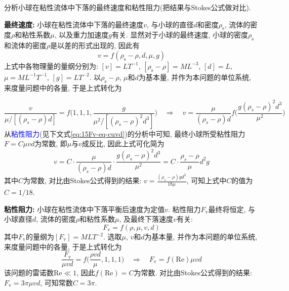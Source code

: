 \begin{problem}[15]
分析小球在粘性流体中下落的最终速度和粘性阻力(把结果与Stokes公式做对比).
\end{problem}
\begin{solution}
\begin{minipage}[c]{0.8\linewidth}
\textbf{最终速度:} 小球在粘性流体中下落的最终速度$v$, 与小球的直径$d$和密度$\rho_\mathrm{s}$, 流体的密度$\rho$和粘性系数$\mu$, 以及重力加速度$g$有关. 显然对于小球的最终速度, 小球的密度$\rho_\mathrm{s}$和流体的密度$\rho$是以差的形式出现的, 因此有
\[
v = f(\rho_\mathrm{s}-\rho, d, \mu, g)
\]
上式中各物理量的量纲分别为: $[v]=LT^{-1}$, $[\rho_\mathrm{s}-\rho]=ML^{-3}$, $[d]=L$, $\mu=ML^{-1}T^{-1}$, $[g]=LT^{-2}$. 以$\rho_\mathrm{s}-\rho$, $\mu$和$d$为基本量, 并作为本问题的单位系统, 来度量问题中的各量, 于是上式转化为
\end{minipage}
\begin{minipage}[c]{0.2\linewidth}
\begin{center}

\end{center}
\end{minipage}\vspace{5pt}
\[
\frac{v}{\mu/[(\rho_s-\rho)d]} = f\bigg(1,1,1,\frac{g}{\mu^2/[(\rho_s-\rho)^2 d^3]}\bigg) 
\quad\Longrightarrow\quad
v = \frac{\mu}{(\rho_s-\rho)d}f\bigg(\frac{g(\rho_s-\rho)^2d^3}{\mu^2}\bigg)
\]
从\textcolor{blue}{粘性阻力}(见下文式\ref{eq:15Fv-eq-cuvd})的分析中可知, 最终小球所受粘性阻力$F=C\mu v d$为常数, 即$\mu$与$v$成反比, 因此上式可化简为
\[
v = C\cdot\frac{\mu}{(\rho_s-\rho)d} \cdot \frac{g(\rho_s-\rho)^2d^3}{\mu^2} 
= C\cdot\frac{\rho_s-\rho}{\mu} d^2 g
\]
其中$C$为常数, 对比由Stokes公式得到的结果: $v = \frac{(\rho_s-\rho)gd^2}{18\mu}$, 可知上式中$C$的值为$C = 1/18$.

\vspace{10pt}

\noindent\textbf{粘性阻力:} 小球在粘性流体中下落平衡后速度为定值$v$. 粘性阻力$F_\mathrm{v}$最终将恒定, 与小球直径$d$, 流体的密度$\rho$和粘性系数$\mu$, 及最终下落速度$v$有关:
\[
F_\mathrm{v} = f(\rho, \mu, v, d)
\]
其中$F_\mathrm{v}$的量纲为$[F_\mathrm{v}]=MLT^{-2}$. 选取$\mu$, $v$和$d$为基本量, 并作为本问题的单位系统, 来度量问题中的各量, 于是上式转化为
\begin{equation}\label{eq:15Fv-eq-cuvd}
\frac{F_\mathrm{v}}{\mu vd} = f\bigg(\frac{\rho v d}{\mu},1,1,1\bigg)
\quad\Longrightarrow\quad
F_\mathrm{v} = f(\mathrm{Re}) \mu vd
\end{equation}
该问题的雷诺数$\mathrm{Re}\ll 1$, 因此$f(\mathrm{Re})=C$为常数. 对比由Stokes公式得到的结果: $F_\mathrm{v} = 3\pi \mu vd$, 可知常数$C=3\pi$.
\vspace{10pt}


\end{solution}
